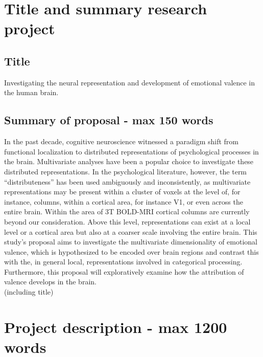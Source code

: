 \documentclass[12pt,a4paper]{article}\usepackage[]{graphicx}\usepackage[]{color}
\begin{document}
\section{Title and summary research project}

\subsection{Title}
Investigating the neural representation and development of emotional valence in the human brain.

\subsection{Summary of proposal \textmd{- max 150 words}}
In the past decade, cognitive neuroscience witnessed a paradigm shift from functional localization to distributed representations of psychological processes in the brain. Multivariate analyses have been a popular choice to investigate these distributed representations. In the psychological literature, however, the term ``distributeness'' has been used ambiguously and inconsistently, as multivariate representations may be present within a cluster of voxels at the level of, for instance, columns, within a cortical area, for instance V1, or even across the entire brain. Within the area of 3T BOLD-MRI cortical columns are currently beyond our consideration. Above this level, representations can exist at a local level or a cortical area but also at a coarser scale involving the entire brain. This study's proposal aims to investigate the multivariate dimensionality of emotional valence, which is hypothesized to be encoded over brain regions and contrast this with the, in general local, representations involved in categorical processing. Furthermore, this proposal will exploratively examine how the attribution of valence develops in the brain. \\

\noindent
\wordcount (including title)

\section{Project description \textmd{- max 1200 words}}
\end{document}
